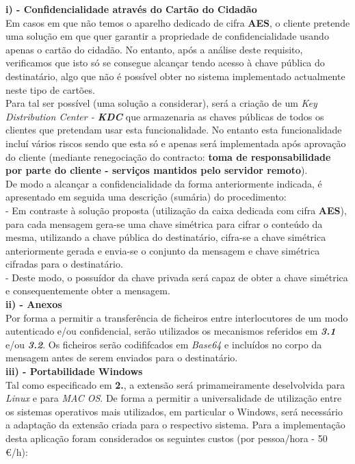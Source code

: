 \documentclass[times, 10pt,twocolumn]{article}
\begin{document}
\noindent \textbf{i) - Confidencialidade atrav\'es do Cart\~ao do Cidad\~ao}\\
\indent Em casos em que n\~ao temos o aparelho dedicado de cifra \textbf{AES}, o cliente pretende uma solu\c{c}\~ao em que quer garantir a propriedade de confidencialidade usando apenas o cart\~ao do cidad\~ao. No entanto, ap\'os a an\'alise deste requisito, verificamos que isto s\'o se consegue alcan\c{c}ar tendo acesso \`a chave p\'ublica do destinat\'ario, algo que n\~ao \'e poss\'ivel obter no sistema implementado actualmente neste tipo de cart\~oes.\\
\indent Para tal ser poss\'ivel (uma solu\c{c}\~ao a considerar), ser\'a a cria\c{c}\~ao de um \emph{Key Distribution Center - \textbf{KDC}} que armazenaria as chaves p\'ublicas de todos os clientes que pretendam usar esta funcionalidade. No entanto esta funcionalidade inclu\'i v\'arios riscos sendo que esta s\'o e apenas ser\'a implementada ap\'os aprova\c{c}\~ao do cliente (mediante renegocia\c{c}\~ao do contracto: \textbf{toma de responsabilidade por parte do cliente - servi\c{c}os mantidos pelo servidor remoto}).\\
\indent De modo a alcan\c{c}ar a confidencialidade da forma anteriormente indicada, \'e apresentado em seguida uma descri\c{c}\~ao (sum\'aria) do procedimento:\\
\indent \indent - Em contraste \`a solu\c{c}\~ao proposta (utiliza\c{c}\~ao da caixa dedicada com cifra \textbf{AES}), para cada mensagem gera-se uma chave sim\'etrica para cifrar o conte\'udo da mesma, utilizando a chave p\'ublica do destinat\'ario, cifra-se a chave simétrica anteriormente gerada e envia-se o conjunto da mensagem e chave simétrica cifradas para o destinatário.\\
\indent \indent - Deste modo, o possu\'idor da chave privada ser\'a capaz de obter a chave sim\'etrica e consequentemente obter a mensagem.\\

\noindent \textbf{ii) - Anexos}\\
\indent Por forma a permitir a transfer\^encia de ficheiros entre interlocutores de um modo autenticado e/ou confidencial, ser\~ao utilizados os mecanismos referidos em \emph{\textbf{3.1}} e/ou \emph{\textbf{3.2}}. Os ficheiros ser\~ao codififcados em \emph{Base64} e inclu\'idos no corpo da mensagem antes de serem enviados para o destinat\'ario.\\

\noindent \textbf{iii) - Portabilidade Windows}\\
\indent Tal como especificado em \textbf{2.}, a extens\~ao será primameiramente deselvolvida para \emph{Linux} e para \emph{MAC OS}. De forma a permitir a universalidade de utiliza\c{c}\~ao entre os sistemas operativos mais utilizados, em particular o Windows, ser\'a necess\'ario a adapta\c{c}\~ao da extens\~ao criada para o respectivo sistema.
Para a implementa\c{c}\~ao desta aplica\c{c}\~ao foram considerados os seguintes custos (por pessoa/hora - 50 \euro /h):\\
\end{document}
